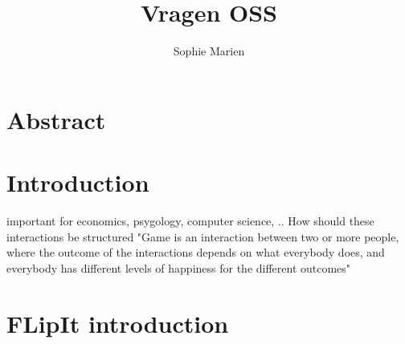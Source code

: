 \documentclass[a4paper, 11pt]{article}
\begin{document}
\begin{titlepage}
\title{Vragen OSS}
\author{Sophie Marien}
\end{titlepage}



\maketitle
\tableofcontents
\newpage

\section{Abstract}
\label{Section:Abstract}

\section{Introduction}
\label{Section:Introduction}
important for economics, psygology, computer science, ..
How should these interactions be structured
"Game is an interaction between two or more people, where the outcome of the interactions depends on what everybody does, and everybody has different levels of happiness for the different outcomes"

\section{FLipIt introduction}
\end{document}
